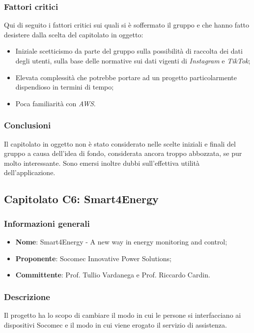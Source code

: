 \documentclass[11pt]{article}
\begin{document}
    \subsubsection{Fattori critici}
    Qui di seguito i fattori critici sui quali si è soffermato il gruppo e che hanno fatto desistere dalla scelta del capitolato in
    oggetto:
    \begin{itemize}
    	\item Iniziale scetticismo da parte del gruppo sulla possibilità di raccolta dei dati degli utenti, sulla base
    	delle normative sui dati vigenti di \textit{Instagram} e \textit{TikTok};
		\item Elevata complessità che potrebbe portare ad un progetto particolarmente dispendioso in termini di tempo;
		\item Poca familiarità con \textit{AWS}.
    \end{itemize}
        
    \subsubsection{Conclusioni}
    Il capitolato in oggetto non è stato considerato nelle scelte iniziali e finali del gruppo a causa dell'idea di fondo, considerata
    ancora troppo abbozzata, se pur molto interessante. Sono emersi inoltre dubbi sull'effettiva utilità dell'applicazione.

\newpage




\subsection{Capitolato C6: Smart4Energy}

    \subsubsection{Informazioni generali}
    \begin{itemize}
        \item \textbf{Nome}: Smart4Energy - A new way in energy monitoring and control;
        \item \textbf{Proponente}: Socomec Innovative Power Solutions;
        \item \textbf{Committente}: Prof. Tullio Vardanega e Prof. Riccardo Cardin.
    \end{itemize}
    
    \subsubsection{Descrizione}
    Il progetto ha lo scopo di cambiare il modo in cui le persone si interfacciano ai dispositivi Socomec e il modo in
    cui viene erogato il servizio di assistenza.
    
\end{document}
